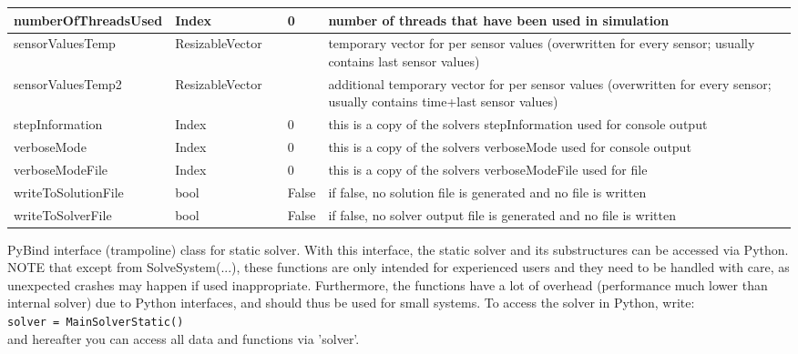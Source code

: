 \begin{center}
\begin{longtable}{| p{4.2cm} | p{2.5cm} | p{0.3cm} | p{3.0cm} | p{6cm} |}
    numberOfThreadsUsed &     Index &      &     0 &     number of threads that have been used in simulation\\ \hline
    sensorValuesTemp &     ResizableVector &      &      &     temporary vector for per sensor values (overwritten for every sensor; usually contains last sensor values)\\ \hline
    sensorValuesTemp2 &     ResizableVector &      &      &     additional temporary vector for per sensor values (overwritten for every sensor; usually contains time+last sensor values)\\ \hline
    stepInformation &     Index &      &     0 &     this is a copy of the solvers stepInformation used for console output\\ \hline
    verboseMode &     Index &      &     0 &     this is a copy of the solvers verboseMode used for console output\\ \hline
    verboseModeFile &     Index &      &     0 &     this is a copy of the solvers verboseModeFile used for file\\ \hline
    writeToSolutionFile &     bool &      &     False &     if false, no solution file is generated and no file is written\\ \hline
    writeToSolverFile &     bool &      &     False &     if false, no solver output file is generated and no file is written\\ \hline
	  \end{longtable}
	\end{center}




\label{sec:MainSolverStatic}
PyBind interface (trampoline) class for static solver. With this interface, the static solver and its substructures can be accessed via Python. NOTE that except from SolveSystem(...), these functions are only intended for experienced users and they need to be handled with care, as unexpected crashes may happen if used inappropriate. Furthermore, the functions have a lot of overhead (performance much lower than internal solver) due to Python interfaces, and should thus be used for small systems. To access the solver in Python, write: \\ 
 \texttt{solver = MainSolverStatic()} \\ 
and hereafter you can access all data and functions via 'solver'.

